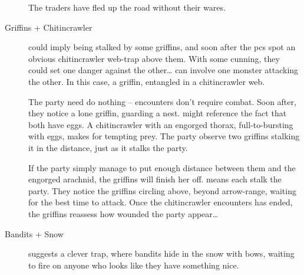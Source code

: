\begin{multicols}{2}
\begin{description}
  The traders have fled up the road without their wares.
  \item[Griffins + Chitincrawler]
  \ifcase\value{season}\relax\or
  could imply being stalked by some griffins, and soon after the \glspl{pc} spot an obvious chitincrawler web-trap above them.
  With some cunning, they could set one danger against the other\ldots
  \or
  can involve one monster attacking the other.
  In this case, a griffin, entangled in a chitincrawler web.

  The party need do nothing -- encounters don't require combat.
  Soon after, they notice a lone griffin, guarding a nest.
  \or
  might reference the fact that both have eggs.
  A chitincrawler with an engorged thorax, full-to-bursting with eggs, makes for tempting prey.
  The party observe two griffins stalking it in the distance, just as it stalks the party.

  If the party simply manage to put enough distance between them and the engorged arachnid, the griffins will finish her off.
  \else%
  means each stalk the party.
  They notice the griffins circling above, beyond arrow-range, waiting for the best time to attack.
  Once the chitincrawler encounters has ended, the griffins reassess how wounded the party appear\ldots
  \fi
  \item[Bandits + Snow]
  suggests a clever trap, where bandits hide in the snow with bows, waiting to fire on anyone who looks like they have something nice.
\end{description}

\end{multicols}

